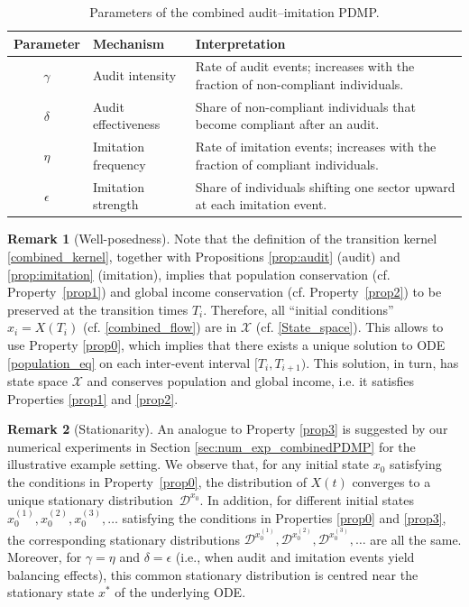 \documentclass[11pt]{article}
\theoremstyle{plain}
\theoremstyle{definition}
\newtheorem{remark}{Remark}
\newcommand{\1}{\mathbf{1}}
\begin{document}
\begin{table}%
\centering
\begin{tabular}{clp{8.5cm}}
\toprule
\textbf{Parameter} & \textbf{Mechanism} & \textbf{Interpretation} \\
\midrule
$\gamma$ & Audit intensity &
Rate of audit events; increases with the fraction of non-compliant individuals. \\[0.6ex]

$\delta$ & Audit effectiveness &
Share of non-compliant individuals that become compliant after an audit. \\[0.6ex]

$\eta$ & Imitation frequency &
Rate of imitation events; increases with the fraction of compliant individuals. \\[0.6ex]

$\epsilon$ & Imitation strength &
Share of individuals shifting one sector upward at each imitation event. \\
\bottomrule
\end{tabular}

\caption{Parameters of the combined audit–imitation PDMP.}
\label{tab_params}
\end{table}

\begin{remark}[Well-posedness]
    Note that the definition of the transition kernel \eqref{combined_kernel}, together with Propositions \ref{prop:audit} (audit) and \ref{prop:imitation} (imitation), implies that population conservation (cf. Property~\ref{prop1}) and global income conservation (cf. Property~\ref{prop2}) to be preserved at the transition times $T_i$. Therefore, all ``initial conditions'' $x_i=X(T_i)$ (cf. \eqref{combined_flow}) are in $\mathcal{X}$ (cf. \eqref{State_space}). This allows to use Property \ref{prop0}, which implies that there exists a unique solution to ODE \eqref{population_eq} on each inter-event interval $[T_i,T_{i+1})$. This solution, in turn, has state space $\mathcal{X}$ and conserves population and global income, i.e. it satisfies Properties \ref{prop1} and \ref{prop2}.
\end{remark}

\begin{remark}[Stationarity]
    An analogue to Property \ref{prop3} is suggested by our numerical experiments in Section \ref{sec:num_exp_combinedPDMP} for the illustrative example setting. We observe that, for any initial state $x_0$ satisfying the conditions in Property~\ref{prop0}, the distribution of $X(t)$ converges to a unique stationary distribution~$\mathcal{D}^{x_0}$.  
    In addition, for different initial states $x_0^{(1)},x_0^{(2)},x_0^{(3)},\ldots$ satisfying the conditions in Properties \ref{prop0} and \ref{prop3}, the corresponding stationary distributions $\mathcal{D}^{x_0^{(1)}},\mathcal{D}^{x_0^{(2)}},\mathcal{D}^{x_0^{(3)}},\ldots$ are all the same. Moreover, for $\gamma=\eta$ and $\delta=\epsilon$ (i.e., when audit and imitation events yield balancing effects), this common stationary distribution is centred near the stationary state $x^*$ of the underlying ODE.
\end{remark}
\end{document}
